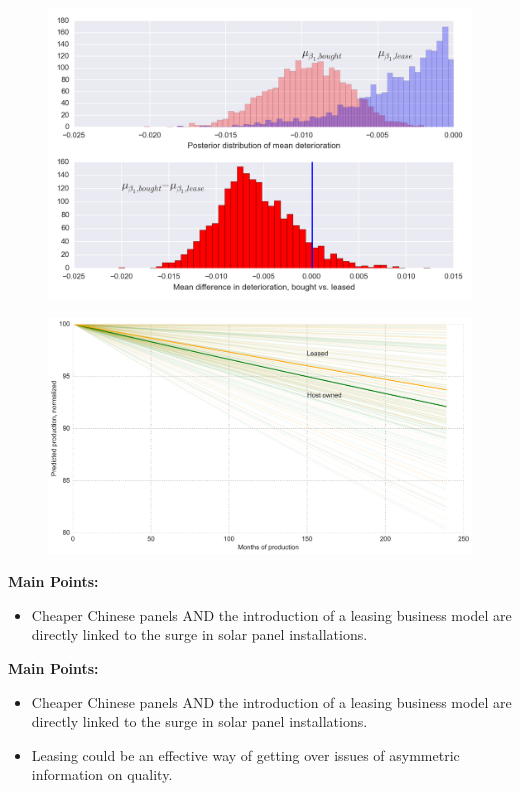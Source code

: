 \documentclass{beamer}
\begin{document}
\begin{frame}
	\begin{figure}
		\includegraphics[width=.8\textwidth]{figures/post_mu_b1.png}
		
		\label{post_mu_b1}
	\end{figure}
\end{frame}

\begin{frame}
	\begin{figure}
		\includegraphics[width=.8\textwidth]{figures/predicted_deg.png}
		\label{predicted_deg}
	\end{figure}
\end{frame}

\begin{frame}[plain]
\textbf{Main Points:}
	\begin{itemize}
	\item Cheaper Chinese panels AND the introduction of a leasing business model are directly linked to the surge in solar panel installations. 
	\end{itemize}
\end{frame}

\begin{frame}[plain]
\textbf{Main Points:}
	\begin{itemize}
	\item Cheaper Chinese panels AND the introduction of a leasing business model are directly linked to the surge in solar panel installations. 
	\item Leasing could be an effective way of getting over issues of asymmetric information on quality. 
	\end{itemize}
\end{frame}
\end{document}
